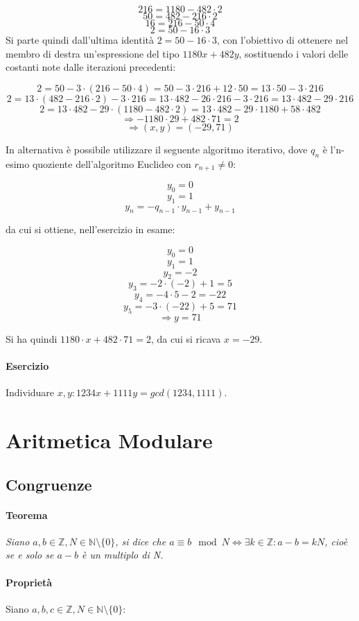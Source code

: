 \documentclass[12pt]{article}
\begin{document}
$$216=1180-482\cdot 2$$
$$50=482-216\cdot 2$$
$$16=216-50\cdot 4$$
$$2=50-16\cdot 3$$
Si parte quindi dall'ultima identità $2=50-16\cdot 3$, con l'obiettivo di ottenere nel membro di destra un'espressione del tipo $1180x+482y$, sostituendo i valori delle costanti note dalle iterazioni precedenti:

$$2=50-3\cdot(216-50\cdot 4)=50-3\cdot 216 + 12\cdot 50=13\cdot 50 - 3\cdot 216$$
$$2=13\cdot (482-216\cdot2) - 3\cdot 216=13\cdot 482 -26\cdot 216-3\cdot 216=13\cdot 482 -29\cdot 216$$
$$2=13\cdot 482 - 29\cdot (1180-482\cdot 2)=13\cdot 482-29\cdot 1180 + 58\cdot 482$$
$$\Rightarrow - 1180\cdot 29 + 482\cdot 71 = 2 $$
$$\Rightarrow (x,y)=(-29,71)$$

In alternativa è possibile utilizzare il seguente algoritmo iterativo, dove $q_n$ è l'n-esimo quoziente dell'algoritmo Euclideo con $r_{n+1}\neq 0$:

$$y_0=0$$
$$y_1=1$$
$$y_n=-q_{n-1}\cdot y_{n-1}+y_{n-1}$$

da cui si ottiene, nell'esercizio in esame:

$$y_0=0$$
$$y_1=1$$
$$y_2=-2$$
$$y_3=-2\cdot (-2)+1=5$$
$$y_4=-4\cdot5-2=-22$$
$$y_5=-3\cdot (-22)+5=71$$
$$\Rightarrow y=71$$

Si ha quindi $1180\cdot x + 482\cdot 71 = 2$, da cui si ricava $x=-29$.

\paragraph{Esercizio} Individuare $x,y:1234x+1111y=gcd(1234,1111)$.
\section{Aritmetica Modulare}
\subsection{Congruenze}
\paragraph{Teorema}
\textit{Siano $a,b\in \mathbb{Z}, N\in \mathbb{N}\setminus \{ 0\} $, si dice che $a\equiv b \mod{N} \Leftrightarrow \exists k\in \mathbb{Z}:a-b=kN$, cioè se e solo se $a-b$ è un multiplo di N.}
\paragraph{Proprietà} Siano $a,b,c\in \mathbb{Z}, N\in \mathbb{N}\setminus \{ 0\} $:
\end{document}
